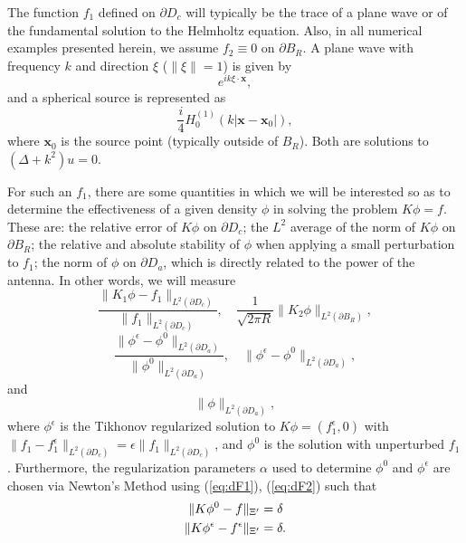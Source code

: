 \documentclass[11pt]{amsart}
\theoremstyle{definition}
\theoremstyle{definition}
\theoremstyle{definition}
\begin{document}
The function $f_{1}$ defined on $\partial D_{c}$ will typically be the trace of a plane wave or of the fundamental solution to the Helmholtz equation. Also, in all numerical examples presented herein, we assume $f_{2} \equiv 0$ on $\partial B_{R}$. A plane wave with frequency $k$ and direction $\xi$ ($\|\xi\| = 1$) is given by
\begin{equation}
e^{ik\xi \cdot \mathbf{x}}, \label{eq:planewavesol}
\end{equation}
and a spherical source is represented as
\begin{equation}
\frac{i}{4}H_{0}^{(1)}(k|\mathbf{x} - \mathbf{x}_{0}|), \label{eq:sphericalsource}
\end{equation}
where $\mathbf{x}_{0}$ is the source point (typically outside of $B_{R}$). Both are solutions to $(\Delta + k^{2})u = 0$.

For such an $f_{1}$, there are some quantities in which we will be interested so as to determine the effectiveness of a given density $\phi$ in solving the problem $K\phi =f$. These are: the relative error of $K\phi$ on $\partial D_{c}$; the $L^{2}$ average of the norm of $K\phi$ on $\partial B_{R}$; the relative and absolute stability of $\phi$ when applying a small perturbation to $f_{1}$; the norm of $\phi$ on $\partial D_{a}$, which is directly related to the power of the antenna. In other words, we will measure
\begin{equation}
\frac{\|K_{1} \phi - f_{1}\|_{L^{2}(\partial D_{c})}}{\|f_{1}\|_{L^{2}(\partial D_{c})}}, \quad \frac{1}{\sqrt{2\pi R}} \|K_{2}\phi\|_{L^{2}(\partial B_{R})}, \label{eq:computevar1}
\end{equation}
\begin{equation}
\frac{\|\phi^{\epsilon}- \phi^{0}\|_{L^{2}(\partial D_{a})}}{\|\phi^{0}\|_{L^{2}(\partial D_{a})}}, \quad \|\phi^{\epsilon} - \phi^{0}\|_{L^{2}(\partial D_{a})}, \label{eq:computevar2}
\end{equation}
and
\begin{equation}
\|\phi\|_{L^{2}(\partial D_{a})}, \label{eq:phinorm}
\end{equation}
where $\phi^{\epsilon}$ is the Tikhonov regularized solution to $K\phi = (f_{1}^{\epsilon},0)$ with $\|f_{1} - f_{1}^{\epsilon}\|_{L^{2}(\partial D_{c})} = \epsilon \|f_{1}\|_{L^{2}(\partial D_{c})}$, and $\phi^{0}$ is the solution with unperturbed $f_{1}$. Furthermore, the regularization parameters $\alpha$ used to determine $\phi^{0}$ and $\phi^{\epsilon}$ are chosen via Newton's Method using (\ref{eq:dF1}), (\ref{eq:dF2}) such that 
\begin{align}
\|K\phi^{0} - f\|_{\Xi'} & = \delta \notag\\
\|K\phi^{\epsilon} - f^{\epsilon}\|_{\Xi'} & = \delta.
\end{align}
\end{document}
